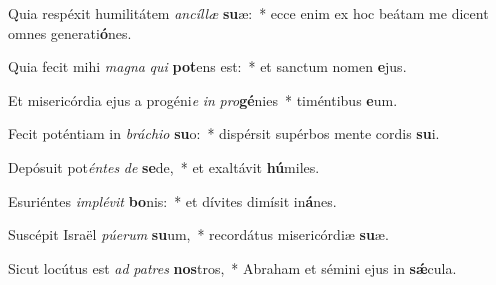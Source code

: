 \item Quia respéxit humilitátem \textit{an}\textit{cíl}\textit{læ} \textbf{su}æ:~* ecce enim ex hoc beátam me dicent omnes generati\textbf{ó}nes.
\item Quia fecit mihi \textit{ma}\textit{gna} \textit{qui} \textbf{pot}ens est:~* et sanctum nomen \textbf{e}jus.
\item Et misericórdia ejus a progéni\textit{e} \textit{in} \textit{pro}\textbf{gé}nies~* timéntibus \textbf{e}um.
\item Fecit poténtiam in \textit{brá}\textit{chi}\textit{o} \textbf{su}o:~* dispérsit supérbos mente cordis \textbf{su}i.
\item Depósuit pot\textit{én}\textit{tes} \textit{de} \textbf{se}de,~* et exaltávit \textbf{hú}miles.
\item Esuriéntes \textit{im}\textit{plé}\textit{vit} \textbf{bo}nis:~* et dívites dimísit in\textbf{á}nes.
\item Suscépit Israël \textit{pú}\textit{e}\textit{rum} \textbf{su}um,~* recordátus misericórdiæ \textbf{su}æ.
\item Sicut locútus est \textit{ad} \textit{pa}\textit{tres} \textbf{nos}tros,~* Abraham et sémini ejus in \textbf{sǽ}cula.
